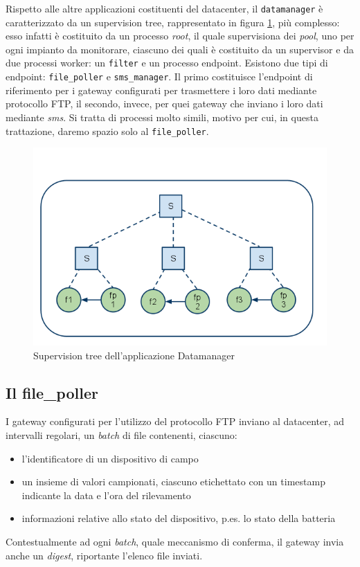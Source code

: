 %
Rispetto alle altre applicazioni costituenti del datacenter, il \texttt{datamanager} \`e 
caratterizzato da un supervision tree, rappresentato in figura \ref{datamanagersuptree},
pi\`u complesso: esso infatti \`e costituito da un processo \emph{root}, il quale supervisiona
dei \emph{pool}, uno per ogni impianto da monitorare, ciascuno dei quali \`e costituito da un 
supervisor e da due processi worker: un \texttt{filter} e un processo endpoint.
%
Esistono due tipi di endpoint: \texttt{file\_poller} e \texttt{sms\_manager}. Il primo costituisce
l'endpoint di riferimento per i gateway configurati per trasmettere i loro dati mediante 
protocollo FTP, il secondo, invece, per quei gateway che inviano i loro dati mediante \emph{sms}.
%
Si tratta di processi molto simili, motivo per cui, in questa trattazione, daremo spazio solo al
\texttt{file\_poller}.
%

%
\begin{figure}[!h]
\centering
\includegraphics[width=380pt]{img/datamanager.png}
\caption{Supervision tree dell'applicazione Datamanager}
\label{datamanagersuptree}
\end{figure}
%

%
\subsection{Il file\_poller}
%
I gateway configurati per l'utilizzo del protocollo FTP inviano al datacenter, 
ad intervalli regolari, un \emph{batch} di file contenenti, ciascuno:
%
\begin{itemize}
\item l'identificatore di un dispositivo di campo
\item un insieme di valori campionati, ciascuno etichettato con un 
      timestamp indicante la data e l'ora del rilevamento
\item informazioni relative allo stato del dispositivo, 
      p.es. lo stato della batteria
\end{itemize}
%
Contestualmente ad ogni \emph{batch}, quale meccanismo di conferma, il gateway invia anche un 
\emph{digest}, riportante l'elenco file inviati.
%

